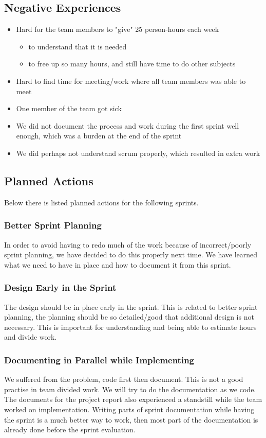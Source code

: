 \subsection{Negative Experiences}
\begin{itemize}
	\item Hard for the team members to "give" 25 person-hours each week
	\begin{itemize}
		\item to understand that it is needed
		\item to free up so many hours, and still have time to do other subjects
	\end{itemize}
	\item Hard to find time for meeting/work where all team members was able to meet
	\item One member of the team got sick
	\item We did not document the process and work during the first sprint well enough, which was a burden at the end of the sprint
	\item We did perhaps not understand scrum properly, which resulted in extra work
\end{itemize}

\subsection{Planned Actions}
Below there is listed planned actions for the following sprints.

\subsubsection{Better Sprint Planning}
In order to avoid having to redo much of the work because of incorrect/poorly
sprint planning, we have decided to do this properly next time. We have learned
what we need to have in place and how to document it from this sprint.

\subsubsection{Design Early in the Sprint} 
The design should be in place early in the sprint. This is related to better
sprint planning, the planning should be so detailed/good that additional design
is not necessary. This is important for understanding and being able to
estimate hours and divide work.

\subsubsection{Documenting in Parallel while Implementing}
We suffered from the problem, code first then document. This is not a good
practise in team divided work. We will try to do the documentation as we code.
The documents for the project report also experienced a standstill while the
team worked on implementation. Writing parts of sprint documentation while
having the sprint is a much better way to work, then most part of the
documentation is already done before the sprint evaluation.

